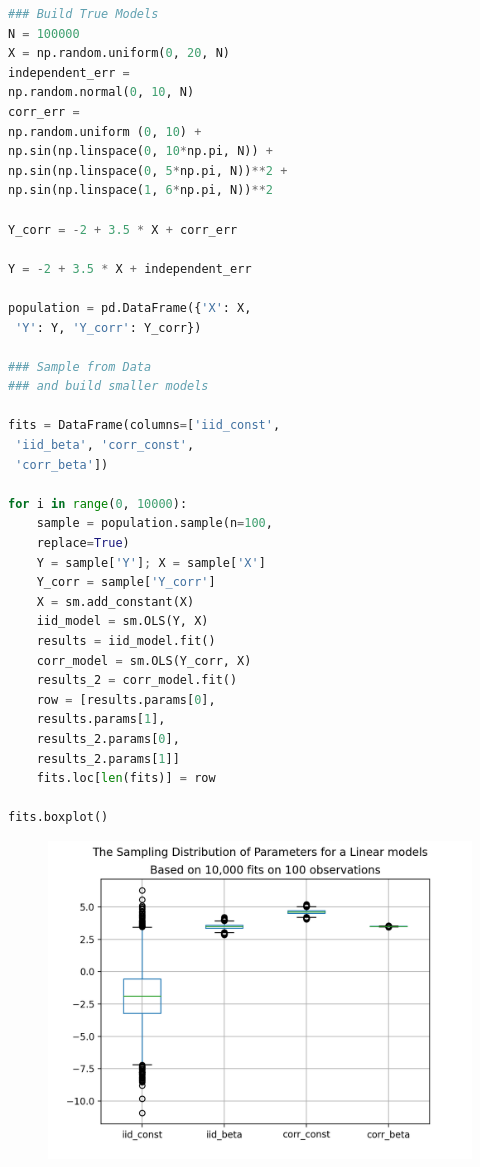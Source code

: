 \documentclass[10pt,a4paper,notitlepage, twocolumn]{article}
\begin{document}
\begin{lstlisting}[language=Python]
### Build True Models
N = 100000
X = np.random.uniform(0, 20, N)
independent_err = 
np.random.normal(0, 10, N)
corr_err = 
np.random.uniform (0, 10) + 
np.sin(np.linspace(0, 10*np.pi, N)) + 
np.sin(np.linspace(0, 5*np.pi, N))**2 + 
np.sin(np.linspace(1, 6*np.pi, N))**2

Y_corr = -2 + 3.5 * X + corr_err

Y = -2 + 3.5 * X + independent_err

population = pd.DataFrame({'X': X,
 'Y': Y, 'Y_corr': Y_corr})

### Sample from Data 
### and build smaller models

fits = DataFrame(columns=['iid_const',
 'iid_beta', 'corr_const', 
 'corr_beta'])
 
for i in range(0, 10000):
    sample = population.sample(n=100, 
    replace=True)
    Y = sample['Y']; X = sample['X']
    Y_corr = sample['Y_corr']
    X = sm.add_constant(X)
    iid_model = sm.OLS(Y, X)
    results = iid_model.fit()
    corr_model = sm.OLS(Y_corr, X)
    results_2 = corr_model.fit()
    row = [results.params[0], 
    results.params[1],
    results_2.params[0], 
    results_2.params[1]]
    fits.loc[len(fits)] = row
    
fits.boxplot()
\end{lstlisting}


\begin{figure}[H]
  \includegraphics[width=\linewidth]{./Plots/distribution_of_beta1.png}
\end{figure}
\end{document}
